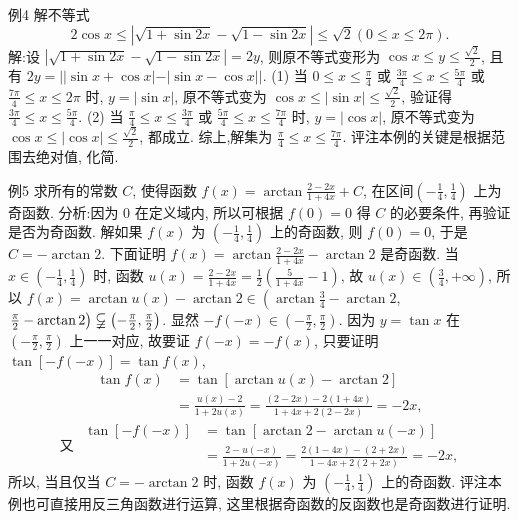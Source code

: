 例4 解不等式
$$
2 \cos x \leqslant|\sqrt{1+\sin 2 x}-\sqrt{1-\sin 2 x}| \leqslant \sqrt{2}(0 \leqslant x \leqslant 2 \pi) .
$$
解:设 $|\sqrt{1+\sin 2 x}-\sqrt{1-\sin 2 x}|=2 y$, 则原不等式变形为 $\cos x \leqslant y \leqslant \frac{\sqrt{2}}{2}$, 且有 $2 y=|| \sin x+\cos x|-| \sin x-\cos x||$.
(1) 当 $0 \leqslant x \leqslant \frac{\pi}{4}$ 或 $\frac{3 \pi}{4} \leqslant x \leqslant \frac{5 \pi}{4}$ 或 $\frac{7 \pi}{4} \leqslant x \leqslant 2 \pi$ 时, $y=|\sin x|$, 原不等式变为 $\cos x \leqslant|\sin x| \leqslant \frac{\sqrt{2}}{2}$, 验证得 $\frac{3 \pi}{4} \leqslant x \leqslant \frac{5 \pi}{4}$.
(2) 当 $\frac{\pi}{4} \leqslant x \leqslant \frac{3 \pi}{4}$ 或 $\frac{5 \pi}{4} \leqslant x \leqslant \frac{7 \pi}{4}$ 时, $y=|\cos x|$, 原不等式变为 $\cos x \leqslant|\cos x| \leqslant \frac{\sqrt{2}}{2}$, 都成立.
综上,解集为 $\frac{\pi}{4} \leqslant x \leqslant \frac{7 \pi}{4}$.
评注本例的关键是根据范围去绝对值, 化简.



例5 求所有的常数 $C$, 使得函数 $f(x)=\arctan \frac{2-2 x}{1+4 x}+C$, 在区间$\left(-\frac{1}{4}, \frac{1}{4}\right)$ 上为奇函数.
分析:因为 0 在定义域内, 所以可根据 $f(0)=0$ 得 $C$ 的必要条件, 再验证是否为奇函数.
解如果 $f(x)$ 为 $\left(-\frac{1}{4}, \frac{1}{4}\right)$ 上的奇函数, 则 $f(0)=0$, 于是 $C=-\arctan 2$.
下面证明 $f(x)=\arctan \frac{2-2 x}{1+4 x}-\arctan 2$ 是奇函数.
当 $x \in\left(-\frac{1}{4}, \frac{1}{4}\right)$ 时, 函数 $u(x)=\frac{2-2 x}{1+4 x}=\frac{1}{2}\left(\frac{5}{1+4 x}-1\right)$, 故 $u(x) \in\left(\frac{3}{4},+\infty\right)$, 所以 $f(x)=\arctan u(x)-\arctan 2 \in\left(\arctan \frac{3}{4}-\arctan 2\right.$, $\left.\frac{\pi}{2}-\arctan 2\right) \varsubsetneqq\left(-\frac{\pi}{2}, \frac{\pi}{2}\right)$.
显然 $-f(-x) \in\left(-\frac{\pi}{2}, \frac{\pi}{2}\right)$.
因为 $y=\tan x$ 在 $\left(-\frac{\pi}{2}, \frac{\pi}{2}\right)$ 上一一对应, 故要证 $f(-x)=-f(x)$, 只要证明 $\tan [-f(-x)]=\tan f(x)$,
$$
\begin{aligned}
\tan f(x) & =\tan [\arctan u(x)-\arctan 2] \\
& =\frac{u(x)-2}{1+2 u(x)}=\frac{(2-2 x)-2(1+4 x)}{1+4 x+2(2-2 x)}=-2 x,
\end{aligned}
$$
$$
\text { 又 } \begin{aligned}
\tan [-f(-x)] & =\tan [\arctan 2-\arctan u(-x)] \\
& =\frac{2-u(-x)}{1+2 u(-x)}=\frac{2(1-4 x)-(2+2 x)}{1-4 x+2(2+2 x)}=-2 x,
\end{aligned}
$$
所以, 当且仅当 $C=-\arctan 2$ 时, 函数 $f(x)$ 为 $\left(-\frac{1}{4}, \frac{1}{4}\right)$ 上的奇函数.
评注本例也可直接用反三角函数进行运算, 这里根据奇函数的反函数也是奇函数进行证明.



